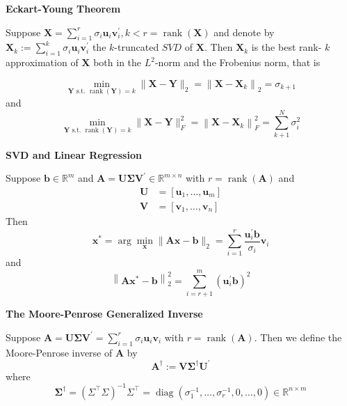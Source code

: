 \documentclass[14pt]{article}
\theoremstyle{definition}
\theoremstyle{remark}
\begin{document}
\begin{multicols*}{2}
    \textbf{Eckart-Young Theorem}

    Suppose $\mathbf{X}=\sum_{i=1}^{r} \sigma_{i} \mathbf{u}_{i} \mathbf{v}_{i}^{\prime},
        k<r=\operatorname{rank}(\mathbf{X})$ and denote by $\mathbf{X}_{k}:=\sum_{i=1}^{k} \sigma_{i}
        \mathbf{u}_{i} \mathbf{v}_{i}^{\prime}$ the $k$-truncated $S V D$ of $\mathbf{X}$.
    Then $\mathbf{X}_{k}$ is the best rank- $k$ approximation of $\mathbf{X}$ both in the $L^{2}$-norm and the Frobenius norm, that is

    $$
        \min _{\mathbf{Y} \text { s.t. } \operatorname{rank}(\mathbf{Y})=k}\|\mathbf{X}-\mathbf{Y}\|_{2}=\left\|\mathbf{X}-\mathbf{X}_{k}\right\|_{2}=\sigma_{k+1}
    $$
    and
    $$
        \min _{\mathbf{Y} \text { s.t. } \operatorname{rank}(\mathbf{Y})=k}\|\mathbf{X}-\mathbf{Y}\|_{F}^{2}=\left\|\mathbf{X}-\mathbf{X}_{k}\right\|_{F}^{2}=\sum_{k+1}^{N} \sigma_{i}^{2}
    $$


    \textbf{SVD and Linear Regression}

    Suppose $\mathbf{b} \in \mathbb{R}^{m}$ and $\mathbf{A}=\mathbf{U} \boldsymbol{\Sigma} \mathbf{V}^{\prime} \in \mathbb{R}^{m \times n}$ with $r=\operatorname{rank}(\mathbf{A})$ and
    $$
        \begin{aligned}
            \mathbf{U} & =\left[\mathbf{u}_{1}, \ldots, \mathbf{u}_{m}\right] \\
            \mathbf{V} & =\left[\mathbf{v}_{1}, \ldots, \mathbf{v}_{n}\right]
        \end{aligned}
    $$
    Then
    $$
        \mathbf{x}^{*} = \arg \min _{\mathbf{x}}\|\mathbf{A x}-\mathbf{b}\|_{2} = \sum_{i=1}^{r} \frac{\mathbf{u}_{i}^{\prime} \mathbf{b}}{\sigma_{i}} \mathbf{v}_{i}
    $$
    and
    $$
        \left\|\mathbf{A} \mathbf{x}^{*}-\mathbf{b}\right\|_{2}^{2}=\sum_{i=r+1}^{m}\left(\mathbf{u}_{i}^{\prime} \mathbf{b}\right)^{2}
    $$

    \textbf{The Moore-Penrose Generalized Inverse}

    Suppose $\mathbf{A}=\mathbf{U} \boldsymbol{\Sigma} \mathbf{V}^{\prime}=\sum_{i=1}^{r} \sigma_{i} \mathbf{u}_{i} \mathbf{v}_{i}$ with $r=\operatorname{rank}(\mathbf{A})$. Then we define the Moore-Penrose inverse of $\mathbf{A}$ by
    $$
        \mathbf{A}^\dagger:=\mathbf{V} \boldsymbol{\Sigma}^\dagger \mathbf{U}^{\prime}
    $$
    where
    $$
        \boldsymbol{\Sigma}^\dagger=\left(\Sigma^\top \Sigma\right)^{-1} \Sigma^\top=\operatorname{diag}\left(\sigma_{1}^{-1}, \ldots, \sigma_{r}^{-1}, 0, \ldots, 0\right) \in \mathbb{R}^{n \times m}
    $$


\end{multicols*}
\end{document}
